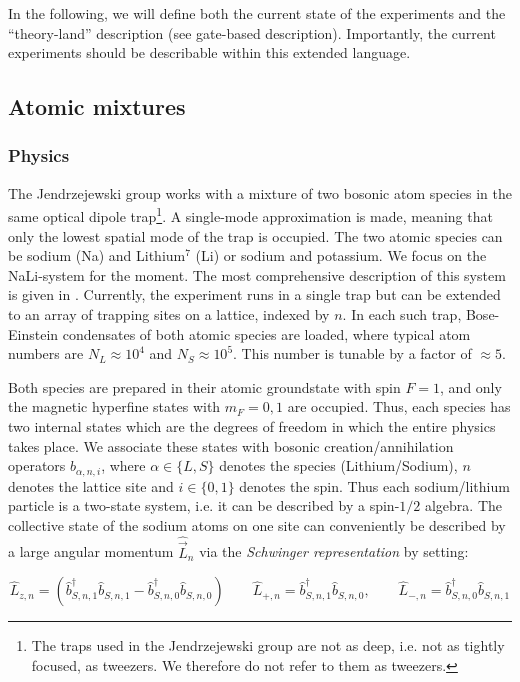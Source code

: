 \documentclass[a4paper, 10pt]{article}
\begin{document}
In the following, we will define both the current state of the experiments and the ``theory-land'' description (see gate-based description).
Importantly, the current experiments should be describable within this extended language.


\subsection{Atomic mixtures}
    \subsubsection{Physics}
    The Jendrzejewski group works with a mixture of two bosonic atom species in the same optical dipole trap\footnote{The traps used in the Jendrzejewski group are not as deep, i.e. not as tightly focused, as tweezers. We therefore do not refer to them as tweezers.}.
    A single-mode approximation is made, meaning that only the lowest spatial mode of the trap is occupied.
    The two atomic species can be sodium (Na) and Lithium$^7$ (Li) or sodium and potassium.
    We focus on the NaLi-system for the moment.
    The most comprehensive description of this system is given in \cite{mil2020experimental}.
    Currently, the experiment runs in a single trap but can be extended to an array of trapping sites on a lattice, indexed by $n$.
    In each such trap, Bose-Einstein condensates of both atomic species are loaded, where typical atom numbers are $N_L \approx 10^4$ and $N_S \approx 10^5$.
    This number is tunable by a factor of $\approx 5$.
    
    Both species are prepared in their atomic groundstate with spin $F = 1$, and only the magnetic hyperfine states with $m_F = 0, 1$ are occupied.
    Thus, each species has two internal states which are the degrees of freedom in which the entire physics takes place.
    We associate these states with bosonic creation/annihilation operators $\hat{b}_{\alpha, n , i}$, where $\alpha \in \{L, S \}$ denotes the species (Lithium/Sodium), $n$ denotes the lattice site and $i \in \{0, 1\}$ denotes the spin.
    Thus each sodium/lithium particle is a two-state system, i.e. it can be described by a spin-$1/2$ algebra.
    The collective state of the sodium atoms on one site can conveniently be described by a large angular momentum $\hat{\vec{L}}_n$ via the \emph{Schwinger representation} by setting:
    
    \begin{equation}
        \label{eq:Schwinger_repr}
        \hat{{L}}_{z, n} = \left(  \hat{b}^\dagger_{S, n , 1}\hat{b}_{S, n , 1}  -  \hat{b}^\dagger_{S, n , 0}\hat{b}_{S, n , 0}\right)  
        \qquad 
        \hat{{L}}_{+ , n} = \hat{b}^\dagger_{S, n , 1}\hat{b}_{S, n , 0}  ,
        \qquad
        \hat{{L}}_{- , n} =  \hat{b}^\dagger_{S, n , 0}\hat{b}_{S, n , 1}    
    \end{equation}
    
\end{document}
